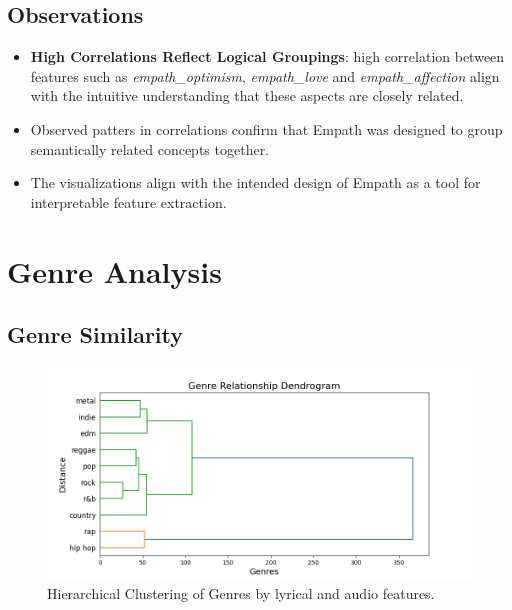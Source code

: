 \subsection*{Observations}

\begin{itemize}
  \item \textbf{High Correlations Reflect Logical Groupings}: high correlation
    between features such as \textit{empath\_optimism}, \textit{empath\_love} and
    \textit{empath\_affection} align with the intuitive understanding that
    these aspects are closely related.
  \item Observed patters in correlations confirm that Empath was designed to
    group semantically related concepts together.
  \item The visualizations align with the intended design of Empath as a tool
    for interpretable feature  extraction.
\end{itemize}



\section{Genre Analysis}

\subsection{Genre Similarity}

\begin{center}
\begin{figure}[H]
  \centering
  \includegraphics[width=5in]{img/genres_dendrogram.png}
  \caption{Hierarchical Clustering of Genres by lyrical and audio features.}
  \label{Figure:dendrogram_spotify_features}
\end{figure}
\end{center}

